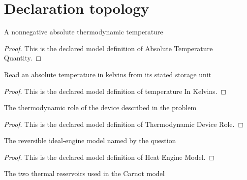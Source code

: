 \section{Declaration topology}
\begin{definition}
  \label{def:physics:phyx-mini-0493:phyxminiproblems-problemphyxmini0493-absolutetemperaturequantity}
  A nonnegative absolute thermodynamic temperature
\end{definition}
\begin{proof}
  This is the declared model definition of Absolute Temperature Quantity.
\end{proof}
\begin{definition}
  \label{def:physics:phyx-mini-0493:phyxminiproblems-problemphyxmini0493-temperatureinkelvins}
  Read an absolute temperature in kelvins from its stated storage unit
\end{definition}
\begin{proof}
  This is the declared model definition of temperature In Kelvins.
\end{proof}
\begin{definition}
  \label{def:physics:phyx-mini-0493:phyxminiproblems-problemphyxmini0493-thermodynamicdevicerole}
  The thermodynamic role of the device described in the problem
\end{definition}
\begin{proof}
  This is the declared model definition of Thermodynamic Device Role.
\end{proof}
\begin{definition}
  \label{def:physics:phyx-mini-0493:phyxminiproblems-problemphyxmini0493-heatenginemodel}
  The reversible ideal-engine model named by the question
\end{definition}
\begin{proof}
  This is the declared model definition of Heat Engine Model.
\end{proof}
\begin{definition}[Reservoir]
  \label{def:physics:phyx-mini-0493:phyxminiproblems-problemphyxmini0493-reservoir}
  The two thermal reservoirs used in the Carnot model
\end{definition}
